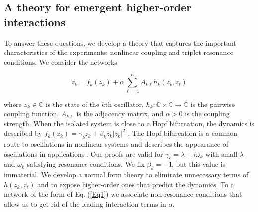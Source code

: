 \documentclass[12pt]{article}
\theoremstyle{plain}
\theoremstyle{definition}
\theoremstyle{remark}
\theoremstyle{remark}
\begin{document}
\subsection*{A theory for emergent higher-order interactions}

To answer these questions, we develop a theory that captures  the important characteristics  of the experiments: nonlinear coupling and triplet  resonance conditions. We consider the networks 
\begin{linenomath}
\begin{equation}\label{Eq1}
\dot{z}_k = f_k(z_k) + \alpha \sum_{\ell=1}^n A_{k\ell} h_k(z_k, z_{\ell})
\end{equation}
\end{linenomath}
where $z_k \in \mathbb{C}$ is the state of the $k$th oscillator, $h_k:  \mathbb{C} \times  \mathbb{C} \rightarrow  \mathbb{C}$  is the pairwise coupling function, $A_{k \ell}$ is the  adjacency matrix, and $\alpha > 0 $ is the coupling strength. When the  isolated system is close to a Hopf bifurcation, the dynamics is described by $f_k (z_k) = \gamma_k z_k + \beta_k z_k |z_k|^2$ \cite{shil2001methods}. The Hopf bifurcation is a common route to oscillations in nonlinear systems and describes  the appearance of oscillations in applications \cite{kralemann2013vivo,Nat2,Ermentrout:10,matheny2019exotic,sebek2016complex}.  Our proofs are valid  for $\gamma_k= \lambda+ i \omega_k$ with small  $\lambda$ and $\omega_k$ satisfying resonance conditions. We  fix $\beta_k=-1$, but this value is immaterial. We develop a normal form theory to  eliminate unnecessary terms of $h(z_k, z_{\ell})$ and to expose higher-order ones that   predict the dynamics.  To a network of the form of Eq. (\ref{Eq1})  we  associate non-resonance conditions that allow us to get rid of the leading interaction terms in $\alpha$.  
\end{document}
